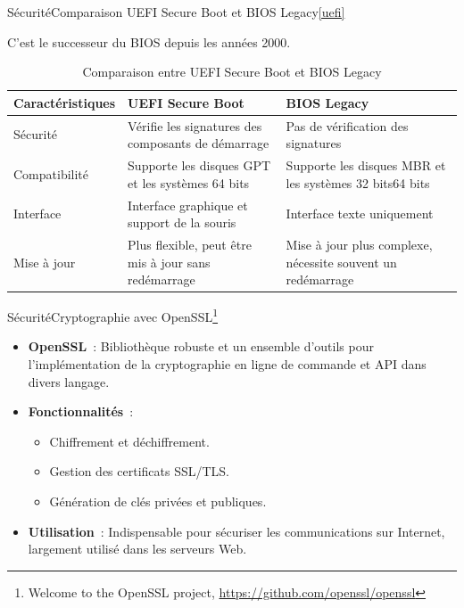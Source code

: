 \documentclass{beamer}
\begin{document}
    \begin{frame}{Sécurité}{Comparaison UEFI Secure Boot et BIOS Legacy\cref{uefi}}
        \begin{footnotesize}
            C'est le successeur du BIOS depuis les années 2000.
            \begin{table}[h!]
                \centering
                \begin{tabular}{|p{2cm}|p{4cm}|p{4cm}|}
                    \hline
                    \textbf{Caractéristiques} & \textbf{UEFI Secure Boot}                            & \textbf{BIOS Legacy}                                        \\
                    \hline
                    Sécurité                  & Vérifie les signatures des composants de démarrage   & Pas de vérification des signatures                          \\
                    \hline
                    Compatibilité             & Supporte les disques GPT et les systèmes 64 bits     & Supporte les disques MBR et les systèmes 32 bits\/64 bits   \\
                    \hline
                    Interface                 & Interface graphique et support de la souris          & Interface texte uniquement                                  \\
                    \hline
                    Mise à jour               & Plus flexible, peut être mis à jour sans redémarrage & Mise à jour plus complexe, nécessite souvent un redémarrage \\
                    \hline
                \end{tabular}
                \caption{Comparaison entre UEFI Secure Boot et BIOS Legacy}
            \end{table}
        \end{footnotesize}
    \end{frame}

    \begin{frame}{Sécurité}{Cryptographie avec OpenSSL\footnote{Welcome to the OpenSSL project, \url{https://github.com/openssl/openssl}}}
        \begin{itemize}
            \item \textbf{OpenSSL}~: Bibliothèque robuste et un ensemble d'outils pour l'implémentation de la cryptographie en ligne de commande et API dans divers langage.
            \item \textbf{Fonctionnalités}~:
            \begin{itemize}
                \item Chiffrement et déchiffrement.
                \item Gestion des certificats SSL/TLS.
                \item Génération de clés privées et publiques.
            \end{itemize}
            \item \textbf{Utilisation}~: Indispensable pour sécuriser les communications sur Internet, largement utilisé dans les serveurs Web.
        \end{itemize}
    \end{frame}
\end{document}

